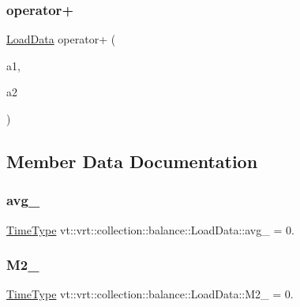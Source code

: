 \subsubsection{\texorpdfstring{operator+}{operator+}}
{\footnotesize\ttfamily \hyperlink{structvt_1_1vrt_1_1collection_1_1balance_1_1_load_data}{Load\+Data} operator+ (\begin{DoxyParamCaption}\item[{\hyperlink{structvt_1_1vrt_1_1collection_1_1balance_1_1_load_data}{Load\+Data}}]{a1,  }\item[{\hyperlink{structvt_1_1vrt_1_1collection_1_1balance_1_1_load_data}{Load\+Data} const \&}]{a2 }\end{DoxyParamCaption})\hspace{0.3cm}{\ttfamily [friend]}}



\subsection{Member Data Documentation}
\mbox{\label{structvt_1_1vrt_1_1collection_1_1balance_1_1_load_data_a3e0f760e59dfb3d80cedac64d36d2e4f}} 
\subsubsection{\texorpdfstring{avg\+\_\+}{avg\_}}
{\footnotesize\ttfamily \hyperlink{namespacevt_a876a9d0cd5a952859c72de8a46881442}{Time\+Type} vt\+::vrt\+::collection\+::balance\+::\+Load\+Data\+::avg\+\_\+ = 0.}

\mbox{\label{structvt_1_1vrt_1_1collection_1_1balance_1_1_load_data_a04e4244881beaca49025897e5620ed07}} 
\subsubsection{\texorpdfstring{M2\+\_\+}{M2\_}}
{\footnotesize\ttfamily \hyperlink{namespacevt_a876a9d0cd5a952859c72de8a46881442}{Time\+Type} vt\+::vrt\+::collection\+::balance\+::\+Load\+Data\+::\+M2\+\_\+ = 0.}


